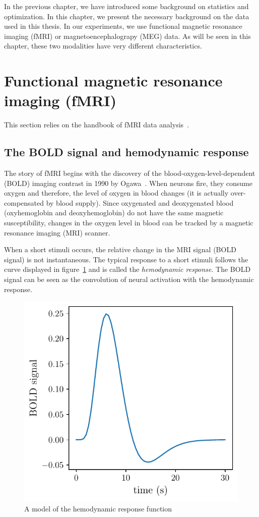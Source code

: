 In the previous chapter, we have introduced some background on statistics and
optimization.
In this chapter, we present the necessary background on the data used in this
thesis.
In our experiments, we use functional magnetic resonance imaging (fMRI) or
magnetoencephalograpy (MEG) data. As will be seen in this chapter, these two modalities have very different
characteristics.

\section{Functional magnetic resonance imaging (fMRI)}
This section relies on the handbook of fMRI data analysis~\cite{poldrack2011handbook}.

\subsection{The BOLD signal and hemodynamic response}
The story of fMRI begins with the discovery of the blood-oxygen-level-dependent
(BOLD) imaging contrast in 1990 by Ogawa~\cite{ogawa1990brain}. When neurons
fire, they consume oxygen and therefore, the level of oxygen in blood changes (it is actually over-compensated by blood supply).
Since oxygenated and deoxygenated blood (oxyhemoglobin
and deoxyhemoglobin) do not have the same magnetic susceptibility, changes in
the oxygen level in blood can be tracked by a magnetic resonance imaging (MRI) scanner.

When a short stimuli occurs, the relative change in the MRI signal (BOLD
signal) is not instantaneous. The typical response to a short stimuli follows the
curve displayed in figure~\ref{fig:hrf} and is called the \emph{hemodynamic response}.
The BOLD signal can be seen as the convolution of neural activation with the hemodynamic response.

\begin{figure}
  \center
  \includegraphics[scale=0.8]{figures/neuroscience/hrf.pdf}
  \caption{A model of the hemodynamic response function}
  \label{fig:hrf}
\end{figure}

